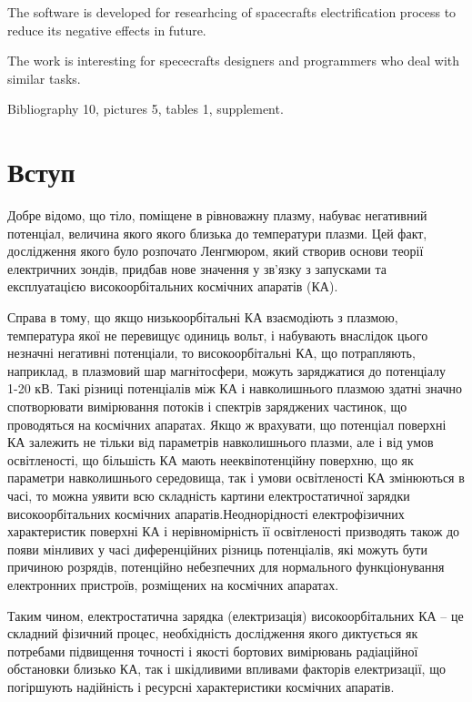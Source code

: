 \documentclass[a4paper,12pt]{article}
\begin{document}
The software is developed for researhcing of spacecrafts electrification process to reduce its negative effects in future.

The work is interesting for spececrafts designers and programmers who deal with similar tasks.

Bibliography 10, pictures 5, tables 1, supplement.

\newpage

\tableofcontents

\newpage

\section*{Вступ}
Добре відомо, що тіло, поміщене в рівноважну плазму, набуває негативний потенціал, величина якого якого близька до температури плазми. Цей факт, дослідження якого було розпочато Ленгмюром, який створив основи теорії електричних зондів, придбав нове значення у зв'язку з запусками та експлуатацією високоорбітальних космічних апаратів (КА).

Справа в тому, що якщо низькоорбітальні КА взаємодіють з плазмою, температура якої не перевищує одиниць вольт, і набувають внаслідок цього незначні негативні потенціали, то високоорбітальні КА, що потрапляють, наприклад, в плазмовий шар магнітосфери, можуть заряджатися до потенціалу ~ 1-20 кВ. Такі різниці потенціалів між КА і навколишнього плазмою здатні значно спотворювати вимірювання потоків і спектрів заряджених частинок, що проводяться на космічних апаратах. Якщо ж врахувати, що потенціал поверхні КА залежить не тільки від параметрів навколишнього плазми, але і від умов освітленості, що більшість КА мають нееквіпотенційну поверхню, що як параметри навколишнього середовища, так і умови освітленості КА змінюються в часі, то можна уявити всю складність картини електростатичної зарядки високоорбітальних космічних апаратів.Неоднорідності електрофізичних характеристик поверхні КА і нерівномірність її освітленості призводять також до появи мінливих у часі диференційних різниць потенціалів, які можуть бути причиною розрядів, потенційно небезпечних для нормального функціонування електронних пристроїв, розміщених на космічних апаратах.

Таким чином, електростатична зарядка (електризація) високоорбітальних КА -- це складний фізичний процес, необхідність дослідження якого диктується як потребами підвищення точності і якості бортових вимірювань радіаційної обстановки близько КА, так і шкідливими впливами факторів електризації, що погіршують надійність і ресурсні характеристики космічних апаратів.
\end{document}
